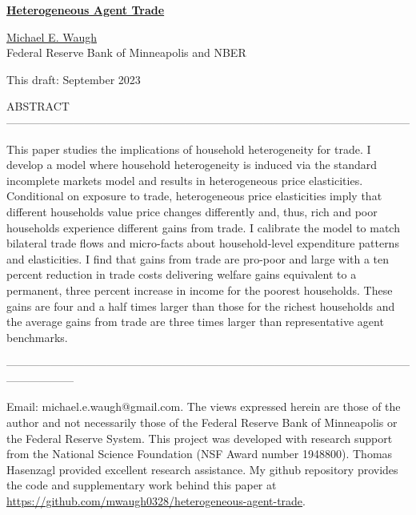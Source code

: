 \documentclass[12pt,pdftex]{article}
\begin{document}
\begin{onehalfspacing}

{\large \textbf{\href{https://www.waugheconomics.com/uploads/2/2/5/6/22563786/heterogeneous-agent-trade.pdf}{Heterogeneous Agent Trade}}}

\vspace{0.5cm}

\href{http://www.waugheconomics.com/}{Michael E. Waugh} \\ Federal Reserve Bank of Minneapolis and NBER

\vspace{0.5cm}

This draft: September 2023

\vspace{1.5cm}


\normalsize

ABSTRACT ------------------------------------------------------------------------------------------------------------

This paper studies the implications of household heterogeneity for trade. I develop a model where household heterogeneity is induced via the standard incomplete markets model and results in heterogeneous price elasticities. Conditional on exposure to trade, heterogeneous price elasticities imply that different households value price changes differently and, thus, rich and poor households experience different gains from trade. I calibrate the model to match bilateral trade flows and micro-facts about household-level expenditure patterns and elasticities. I find that gains from trade are pro-poor and large with a ten percent reduction in trade costs delivering welfare gains equivalent to a permanent, three percent increase in income for the poorest households. These gains are four and a half times larger than those for the richest households and the average gains from trade are three times larger than representative agent benchmarks.

------------------------------------------------------------------------------------------------------------------------------
%

\vspace{6.0cm}

\footnotesize Email: michael.e.waugh@gmail.com. The views expressed herein are those of the author and not necessarily those of the Federal Reserve Bank of Minneapolis or the Federal Reserve System. This project was developed with research support from the National Science Foundation (NSF Award number 1948800). Thomas Hasenzagl provided excellent research assistance. My github repository provides the code and supplementary work behind this paper at \url{https://github.com/mwaugh0328/heterogeneous-agent-trade}.


\end{onehalfspacing}
\end{document}
